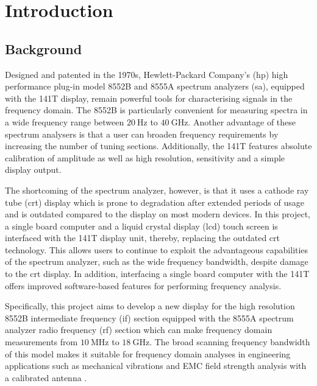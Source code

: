 \documentclass[class=report,11pt,crop=false]{standalone}
\begin{document}
\chapter{Introduction \label{ch:intro}}

\section{Background}
Designed and patented in the 1970s, Hewlett-Packard Company's (\acrshort{hp}) high performance plug-in model 8552B and 8555A spectrum analyzers (\acrshort{sa}), equipped with the 141T display, remain powerful tools for characterising signals in the frequency domain. The 8552B is particularly convenient for measuring spectra in a wide frequency range between $\SI{20}{\hertz}$ to $\SI{40}{\giga\hertz}$. Another advantage of these spectrum analysers is that a user can broaden frequency requirements by increasing the number of tuning sections. Additionally, the 141T features absolute calibration of amplitude as well as high resolution, sensitivity and a simple display output.  

The shortcoming of the spectrum analyzer, however, is that it uses a cathode ray tube (\acrshort{crt}) display which is prone to degradation after extended periods of usage and is outdated compared to the display on most modern devices. In this project, a single board computer and a liquid crystal display (\acrshort{lcd}) touch screen is interfaced with the 141T display unit, thereby, replacing the outdated \acrshort{crt} technology. This allows users to continue to exploit the advantageous capabilities of the spectrum analyzer, such as the wide frequency bandwidth, despite damage to the \acrshort{crt} display. In addition, interfacing a single board computer with the 141T offers improved software-based features for performing frequency analysis.

Specifically, this project aims to develop a new display for the high resolution 8552B intermediate frequency (\acrshort{if}) section equipped with the 8555A spectrum analyzer radio frequency (\acrshort{rf}) section which can make frequency domain measurements from $\SI{10}{\mega\hertz}$ to $\SI{18}{\giga\hertz}$. The broad scanning frequency bandwidth of this model makes it suitable for frequency domain analyses in engineering applications such as mechanical vibrations and EMC field strength analysis with a calibrated antenna \cite{HP}. 
\end{document}

